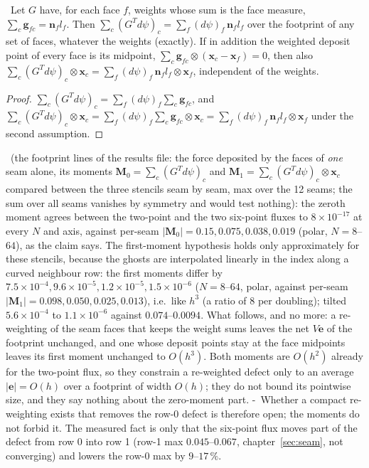 \begin{claim}\derived\
Let $G$ have, for each face $f$, weights whose sum is the face measure, $\sum_c\bm g_{fc}=\bm n_f l_f$. Then
$\sum_c (G^T d\psi)_c=\sum_f (d\psi)_f\,\bm n_f l_f$ over the footprint of any set of faces, whatever the weights
(exactly). If in addition the weighted deposit point of every face is its midpoint,
$\sum_c \bm g_{fc}\otimes(\bm x_c-\bm x_f)=0$, then also $\sum_c (G^T d\psi)_c\otimes\bm x_c=\sum_f (d\psi)_f\,
\bm n_f l_f\otimes\bm x_f$, independent of the weights.
\end{claim}
\begin{proof}
$\sum_c (G^T d\psi)_c=\sum_f (d\psi)_f\sum_c \bm g_{fc}$, and $\sum_c(G^T d\psi)_c\otimes\bm x_c=\sum_f(d\psi)_f
\sum_c \bm g_{fc}\otimes\bm x_c=\sum_f (d\psi)_f\,\bm n_f l_f\otimes\bm x_f$ under the second assumption.
\end{proof}
\measured\ (the footprint lines of the results file: the force deposited by the faces of \emph{one} seam alone, its
moments $\bm M_0=\sum_c(G^Td\psi)_c$ and $\bm M_1=\sum_c(G^Td\psi)_c\otimes\bm x_c$ compared between the three stencils
seam by seam, max over the 12 seams; the sum over all seams vanishes by symmetry and would test nothing): the zeroth
moment agrees between the two-point and the two six-point fluxes to $8\times10^{-17}$ at every $N$ and axis, against
per-seam $|\bm M_0|=0.15,0.075,0.038,0.019$ (polar, $N=8$--$64$), as the claim says. The first-moment hypothesis holds
only approximately for these stencils, because the ghosts are interpolated linearly in the index along a curved
neighbour row: the first moments differ by $7.5\times10^{-4},9.6\times10^{-5},1.2\times10^{-5},1.5\times10^{-6}$
($N=8$--$64$, polar, against per-seam $|\bm M_1|=0.098,0.050,0.025,0.013$), i.e.\ like $h^3$ (a ratio of 8 per
doubling); tilted $5.6\times10^{-4}$ to $1.1\times10^{-6}$ against $0.074$--$0.0094$. What follows, and no more:
a re-weighting of the seam faces that keeps the weight sums leaves the net $V\bm e$ of the footprint unchanged, and one
whose deposit points stay at the face midpoints leaves its first moment unchanged to $O(h^3)$. Both moments are
$O(h^2)$ already for the two-point flux, so they constrain a re-weighted defect only to an average $|\bm e|=O(h)$ over
a footprint of width $O(h)$; they do not bound its pointwise size, and they say nothing about the zero-moment part. \hyp\
Whether a compact re-weighting exists that removes the row-0 defect is therefore open; the moments do not forbid it.
The measured fact is only that the six-point flux moves part of the defect from row 0 into row 1 (row-1 max
$0.045$--$0.067$, chapter~\ref{sec:seam}, not converging) and lowers the row-0 max by $9$--$17\,\%$.

